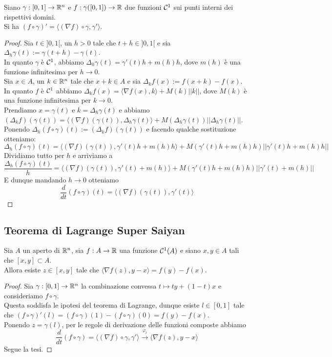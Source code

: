 \documentclass{article}
\begin{document}
\begin{theorem}{}{}
    Siano $\gamma : [0,1]\to\mathbb{R}^n$ e $f:\gamma([0,1])\to\mathbb{R}$ due funzioni $\mathcal{C}^1$ sui punti interni dei rispettivi domini.\\
    Si ha $(f\circ\gamma)' = \langle(\nabla f)\circ\gamma, \gamma'\rangle$.
\end{theorem}
\begin{proof}
    Sia $t \in ]0,1[$, un $h>0$ tale che $t+h \in ]0,1[$ e sia $\Delta_h \gamma(t) := \gamma(t+h)-\gamma(t)$.\\
    In quanto $\gamma$ è $\mathcal{C}^1$, abbiamo $\Delta_h \gamma(t) = \gamma'(t) h + m(h)h$, dove $m(h)$ è una funzione infinitesima per $h\to 0$.\\
    Sia $x \in A$, un $k\in \mathbb{R}^n$ tale che $x+k \in A$ e sia $\Delta_k f(x) := f(x+k)- f(x)$.\\
    In quanto $f$ è $\mathcal{C}^1$ abbiamo $\Delta_k f(x) = \langle\nabla f(x), k\rangle + M(k)||k||$, dove $M(k)$ è una funzione infinitesima per $k\to 0$.\\
    Prendiamo $x = \gamma(t)$ e $k = \Delta_h\gamma(t)$ e abbiamo $(\Delta_k f)(\gamma(t)) = \langle (\nabla f)(\gamma(t)), \Delta_h \gamma(t)\rangle + M(\Delta_h\gamma(t))||\Delta_h\gamma(t)||$.\\
    Ponendo $\Delta_h (f\circ \gamma)(t) := (\Delta_k f)(\gamma(t))$ e facendo qualche sostituzione otteniamo:
    \[\Delta_h (f\circ \gamma)(t) = \langle (\nabla f)(\gamma(t)), \gamma'(t) h + m(h)h\rangle + M(\gamma'(t) h + m(h)h)||\gamma'(t) h + m(h)h||\]
    Dividiamo tutto per $h$ e arriviamo a
    \[\frac{\Delta_h (f\circ \gamma)(t)}{h} = \langle (\nabla f)(\gamma(t)), \gamma'(t) + m(h)\rangle + M(\gamma'(t)h + m(h)h)||\gamma'(t) + m(h)||\]
    E dunque mandando $h\to 0$ otteniamo
    \[\frac{d}{dt}(f\circ\gamma)(t) = \langle (\nabla f)(\gamma(t)), \gamma'(t)\rangle\] 
\end{proof}

\subsection{Teorema di Lagrange Super Saiyan}

\begin{theorem}{}{}
    Sia $A$ un aperto di $\mathbb{R}^n$, sia $f:A\to\mathbb{R}$ una funzione $\mathcal{C}^1(A)$ e siano $x,y \in A$ tali che $[x,y]\subset A$.\\
    Allora esiste $z \in [x,y]$ tale che $\langle\nabla f(z), y-x\rangle = f(y)-f(x)$.
\end{theorem}
\begin{proof}
    Sia $\gamma : [0,1]\to\mathbb{R}^n$ la combinazione convessa $t\mapsto ty + (1-t)x$ e consideriamo $f\circ \gamma$.\\
    Questa soddisfa le ipotesi del teorema di Lagrange, dunque esiste $l \in [0,1]$ tale che $(f\circ\gamma)'(l) = (f\circ\gamma)(1)-(f\circ\gamma)(0) = f(y)-f(x)$.\\
    Ponendo $z = \gamma(l)$, per le regole di derivazione delle funzioni composte abbiamo
    \[\frac{d}{dt}(f\circ\gamma) = \langle(\nabla f)\circ\gamma,\gamma'\rangle \xrightarrow{\varphi_l} \langle\nabla f(z),y-x\rangle\]
    Segue la tesi.
\end{proof}
\end{document}
